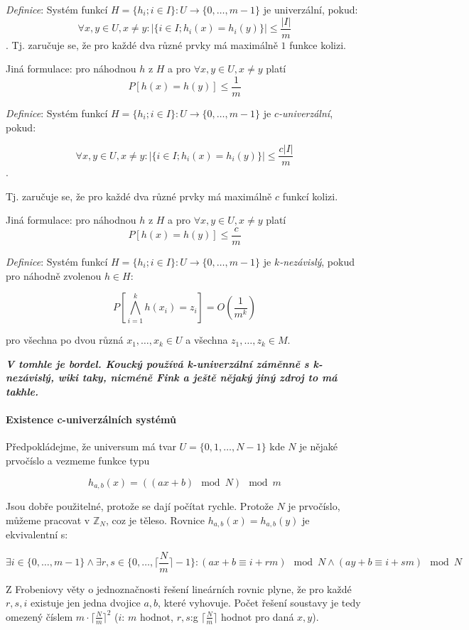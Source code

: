 \documentclass[11pt]{report} %
\numberwithin{equation}{section}
\begin{document}
\emph{Definice}: Systém funkcí $H = \{ h_i; i \in I\}: U\to \{0,\dots,m-1\}$ je univerzální, pokud:
$$\forall x,y\in U, x\neq y: |\{i\in I; h_i(x)=h_i(y)\}|\leq \frac{|I|}{m}$$.
Tj. zaručuje se, že pro každé dva různé prvky má maximálně $1$ funkce kolizi.

Jiná formulace: pro náhodnou $h$ z $H$ a pro $\forall x,y \in U, x \neq y$ platí $$P[h(x) = h(y)] \leq \frac{1}{m}$$

\emph{Definice}: Systém funkcí $H = \{ h_i; i \in I\}: U\to \{0,\dots,m-1\}$ je $c$\emph{-univerzální}, pokud:

$$\forall x,y\in U, x\neq y: |\{i\in I; h_i(x)=h_i(y)\}|\leq \frac{c|I|}{m}$$.

Tj. zaručuje se, že pro každé dva různé prvky má maximálně $c$ funkcí kolizi.

Jiná formulace: pro náhodnou $h$ z $H$ a pro $\forall x,y \in U, x \neq y$ platí $$P[h(x) = h(y)] \leq \frac{c}{m}$$

\emph{Definice}: Systém funkcí $H = \{ h_i; i \in I\}: U\to \{0,\dots,m-1\}$ je $k$\emph{-nezávislý}, pokud pro náhodně zvolenou $h \in H$:

$$P[\bigwedge_{i=1}^{k} h(x_i) = z_i] = O(\frac{1}{m^k})$$

pro všechna po dvou různá $x_1, \dots, x_k \in U$ a všechna $z_1,\dots, z_k \in M$.

\textit{\textbf{V tomhle je bordel. Koucký používá k-univerzální záměnně s k-nezávislý, wiki taky, nicméně Fink a ještě nějaký jiný zdroj to má takhle.}}

\paragraph{Existence c-univerzálních
	systémů}\label{existence-c-univerzuxe1lnuxedch-systuxe9mux16f}

Předpokládejme, že universum má tvar $U=\{0,1,\dots,N-1\}$ kde
$N$ je nějaké prvočíslo a vezmeme funkce typu

$$h_{a,b}(x)=((ax + b) \mod N)\mod m$$

Jsou dobře použitelné, protože se dají počítat rychle. Protože $N$
je prvočíslo, můžeme pracovat v $\mathbb{Z}_N$, coz je těleso.
Rovnice $h_{a,b}(x)=h_{a,b}(y)$ je ekvivalentní s:

$$\exists i\in\{0,\dots,m-1\} \wedge \exists r,s\in\{0,\dots,\lceil\frac{N}{m}\rceil -1\} : (ax + b \equiv i + rm) \mod N \wedge (ay+ b \equiv i + sm) \mod N $$

Z Frobeniovy věty o jednoznačnosti řešení lineárních rovnic plyne, že
pro každé $r,s,i$ existuje jen jedna dvojice $a,b$, které
vyhovuje. Počet řešení soustavy je tedy omezený číslem
$m\cdot\lceil\frac{N}{m}\rceil^2$ ($i$:  $m$
hodnot, $r,s$:g $\lceil\frac{N}{m}\rceil$ hodnot pro daná
$x,y$).
\end{document}
